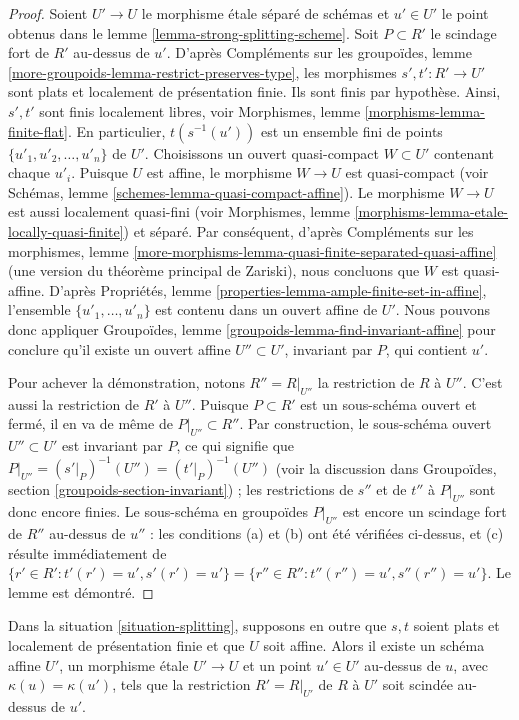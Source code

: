 \begin{proof}
Soient $U' \to U$ le morphisme \'etale séparé de schémas et $u' \in U'$ le point
obtenus dans le lemme \ref{lemma-strong-splitting-scheme}.
Soit $P \subset R'$ le scindage fort de $R'$ au-dessus de $u'$. D'après
Compléments sur les groupoïdes, lemme \ref{more-groupoids-lemma-restrict-preserves-type},
les morphismes $s', t' : R' \to U'$ sont plats et localement de présentation finie.
Ils sont finis par hypothèse. Ainsi, $s', t'$ sont finis
localement libres, voir
Morphismes, lemme \ref{morphisms-lemma-finite-flat}.
En particulier, $t(s^{-1}(u'))$ est un ensemble fini de points
$\{u'_1, u'_2, \ldots, u'_n\}$ de $U'$. Choisissons un ouvert quasi-compact
$W \subset U'$ contenant chaque $u'_i$. Puisque $U$ est affine, le morphisme
$W \to U$ est quasi-compact (voir
Schémas, lemme \ref{schemes-lemma-quasi-compact-affine}).
Le morphisme $W \to U$ est aussi localement quasi-fini (voir
Morphismes, lemme \ref{morphisms-lemma-etale-locally-quasi-finite})
et séparé. Par conséquent, d'après
Compléments sur les morphismes,
lemme \ref{more-morphisms-lemma-quasi-finite-separated-quasi-affine}
(une version du théorème principal de Zariski),
nous concluons que $W$ est quasi-affine. D'après
Propriétés, lemme \ref{properties-lemma-ample-finite-set-in-affine},
l'ensemble $\{u'_1, \ldots, u'_n\}$ est contenu dans un ouvert affine
de $U'$. Nous pouvons donc appliquer
Groupoïdes, lemme \ref{groupoids-lemma-find-invariant-affine}
pour conclure qu'il existe un ouvert affine $U'' \subset U'$, invariant par
$P$, qui contient $u'$.

\medskip\noindent
Pour achever la démonstration, notons $R'' = R|_{U''}$ la restriction de $R$
à $U''$. C'est aussi la restriction de $R'$ à $U''$.
Puisque $P \subset R'$ est un sous-schéma ouvert et fermé, il en va de même de
$P|_{U''} \subset R''$. Par construction, le sous-schéma ouvert $U'' \subset U'$
est invariant par $P$, ce qui signifie que
$P|_{U''} = (s'|_P)^{-1}(U'') = (t'|_P)^{-1}(U'')$
(voir la discussion dans
Groupoïdes, section \ref{groupoids-section-invariant}) ;
les restrictions de $s''$ et de $t''$ à $P|_{U''}$ sont donc encore finies.
Le sous-schéma en groupoïdes $P|_{U''}$ est encore un scindage fort de
$R''$ au-dessus de $u''$ : les conditions (a) et (b) ont été vérifiées ci-dessus,
et (c) résulte immédiatement de $\{r' \in R': t'(r') = u', s'(r') = u'\} =
\{r'' \in R'': t''(r'') = u', s''(r'') = u'\}$.
Le lemme est démontré.
\end{proof}

\begin{lemma}
\label{lemma-splitting-affine-scheme}
Dans la situation \ref{situation-splitting}, supposons en outre que
$s, t$ soient plats et localement de présentation finie et que $U$ soit affine.
Alors il existe un schéma affine $U'$, un morphisme \'etale
$U' \to U$ et un point $u' \in U'$ au-dessus de $u$, avec
$\kappa(u) = \kappa(u')$, tels que la restriction $R' = R|_{U'}$ de
$R$ à $U'$ soit scindée au-dessus de $u'$.
\end{lemma}

